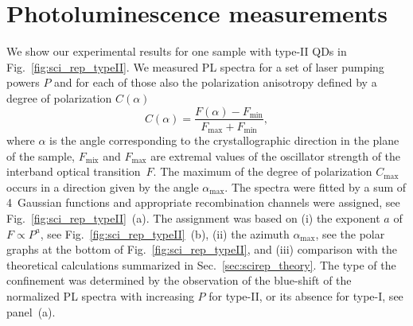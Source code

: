 \section{Photoluminescence measurements}
%
We show our experimental results for one sample with type-II QDs in Fig.~\ref{fig:sci_rep_typeII}. We measured PL spectra for a set of laser pumping powers $P$ and for each of those also the polarization anisotropy defined by a degree of polarization $C(\alpha)$
\begin{equation}
C(\alpha)=\frac{F(\alpha)-F_\mathrm{min}}{F_\mathrm{max}+F_\mathrm{min}},
\end{equation}
where $\alpha$ is the angle corresponding to the crystallographic direction in the plane of the sample, $F_\mathrm{mix}$ and $F_\mathrm{max}$ are extremal values of the oscillator strength of the interband optical transition~$F$. The maximum of the degree of polarization $C_\mathrm{max}$ occurs in a direction given by the angle $\alpha_\mathrm{max}$. The spectra were fitted by a sum of 4~Gaussian functions and appropriate recombination channels were assigned, see Fig.~\ref{fig:sci_rep_typeII}~(a). The assignment was based on (i) the exponent $a$ of $F\propto P^a$, see Fig.~\ref{fig:sci_rep_typeII}~(b), (ii) the azimuth $\alpha_\mathrm{max}$, see the polar graphs at the bottom of Fig.~\ref{fig:sci_rep_typeII}, and (iii) comparison with the theoretical calculations summarized in Sec.~\ref{sec:scirep_theory}. The type of the confinement was determined by the observation of the blue-shift of the normalized PL spectra with increasing $P$ for type-II, or its absence for type-I, see panel~(a).

